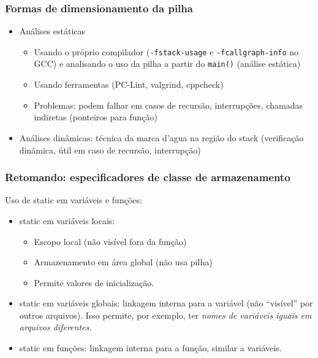 \documentclass{beamer}
\begin{document}
\begin{frame}
	\frametitle{Formas de dimensionamento da pilha}
	\begin{itemize}
		\item Análises estáticas
		\begin{itemize}
			\item Usando o próprio compilador (\texttt{-fstack-usage} e \texttt{-fcallgraph-info} no GCC) e analisando o uso da pilha a partir do \texttt{main()} (análise estática)
			\item Usando ferramentas (PC-Lint, valgrind, cppcheck)
			\item Problemas: podem falhar em casos de recursão, interrupções, chamadas indiretas (ponteiros para função)
		\end{itemize}
		\item Análises dinâmicas: técnica da marca d'agua na região do stack (verificação dinâmica, útil em caso de recursão, interrupção)
		\end{itemize}
\end{frame}

\begin{frame}
	\frametitle{Retomando: especificadores de classe de armazenamento}
		Uso de static em variáveis e funções:
	\vspace*{0.5cm}
	\begin{itemize}
	\item static em variáveis locais:
		\begin{itemize}
		\item Escopo local (não visível fora da função)
		\item Armazenamento em área global (não usa pilha)
		\item Permite valores de inicialização.
		\end{itemize}
	\item static em variáveis globais: linkagem interna para a variável (não ``visível'' por outros arquivos).  Isso permite, por exemplo, ter \textit{nomes de variáveis iguais em arquivos diferentes}.
	\item static em funções: linkagem interna para a função, similar a variáveis.
	\end{itemize}
\end{frame}
\end{document}
